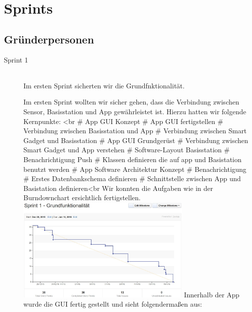 \usepackage{graphicx} 
\section{Sprints}
\subsection{Gründerpersonen}
\begin{description}

	\item [Sprint 1] \hfill \\
	Im ersten Sprint sicherten wir die Grundfnktionalität. 
		\begin{description}
			Im ersten Sprint wollten wir sicher gehen, dass die Verbindung zwischen Sensor, Basisstation und App gewährleistet ist. Hierzu hatten wir folgende Kernpunkte: <br\>
# App GUI Konzept 
# App GUI fertigstellen
# Verbindung zwischen Basisstation und App
# Verbindung zwischen Smart Gadget und Basisstation
# App GUI Grundgerüst
# Verbindung zwischen Smart Gadget und App verstehen
# Software-Layout Basisstation
# Benachrichtigung Push
# Klassen definieren die auf app und Basistation benutzt werden
# App Software Architektur Konzept
# Benachrichtigung
# Erstes Datenbankschema definieren
# Schnittstelle zwischen App und Basistation definieren<br\>
Wir konnten die Aufgaben wie in der Burndownchart ersichtlich fertigstellen.
\includegraphics[width=0.7\textwidth]{burndown_sprint1.jpg}
Innerhalb der App wurde die GUI fertig gestellt und sieht folgendermaßen aus:

\end{description}
\end{description}
